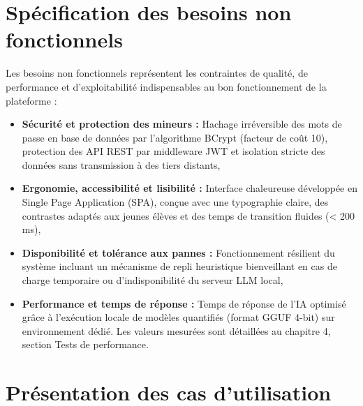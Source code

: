 \documentclass[12pt,a4paper]{report}
\begin{document}
\section{Spécification des besoins non fonctionnels}
Les besoins non fonctionnels représentent les contraintes de qualité, de performance et d'exploitabilité indispensables au bon fonctionnement de la plateforme :
\begin{itemize}
  \item[—] \textbf{Sécurité et protection des mineurs :} Hachage irréversible des mots de passe en base de données par l'algorithme BCrypt (facteur de coût 10), protection des API REST par middleware JWT et isolation stricte des données sans transmission à des tiers distants,
  \item[—] \textbf{Ergonomie, accessibilité et lisibilité :} Interface chaleureuse développée en Single Page Application (SPA), conçue avec une typographie claire, des contrastes adaptés aux jeunes élèves et des temps de transition fluides (< 200 ms),
  \item[—] \textbf{Disponibilité et tolérance aux pannes :} Fonctionnement résilient du système incluant un mécanisme de repli heuristique bienveillant en cas de charge temporaire ou d'indisponibilité du serveur LLM local,
  \item[—] \textbf{Performance et temps de réponse :} Temps de réponse de l'IA optimisé grâce à l'exécution locale de modèles quantifiés (format GGUF 4-bit) sur environnement dédié. Les valeurs mesurées sont détaillées au chapitre 4, section Tests de performance.
\end{itemize}

\section{Présentation des cas d'utilisation}
\end{document}
